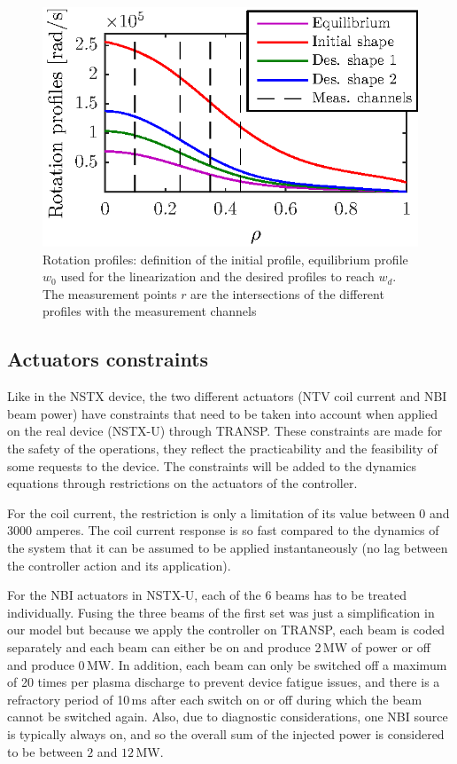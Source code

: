 \documentclass[12pt,lot, lof]{puthesis}
\begin{document}
\begin{figure}[htbp]
	\centering
	\includegraphics[width=0.7 \linewidth]{chap10/initial}
	\caption{Rotation profiles: definition of the initial profile, equilibrium profile $w_0$ used for the linearization and the desired profiles to reach $w_d$. The measurement points $r$ are the intersections of the different profiles with the measurement channels}
	\label{initnstxu}
\end{figure}

\subsection{Actuators constraints}
\label{constraintsnstxu}
Like in the NSTX device, the two different actuators (NTV coil current and NBI beam power) have constraints that need to be taken into account when applied on the real device (NSTX-U) through TRANSP. These constraints are made for the safety of the operations, they reflect the practicability and the feasibility of some requests to the device. The constraints will be added to the dynamics equations through restrictions on the actuators of the controller.

For the coil current, the restriction is only a limitation of its value between 0 and 3000 amperes.
The coil current response is so fast compared to the dynamics of the system that it can be assumed to be applied instantaneously (no lag between the controller action and its application).

For the NBI actuators in NSTX-U, each of the 6 beams has to be treated individually. Fusing the three beams of the first set was just a simplification in our model but because we apply the controller on TRANSP, each beam is coded separately and each beam can either be on and produce 2\,MW of power or off and produce 0\,MW.
In addition, each beam can only be switched off a maximum of 20 times per plasma discharge to prevent device fatigue issues, and there is a refractory period of 10\,ms after each switch on or off during which the beam cannot be switched again.
Also, due to diagnostic considerations, one NBI source is typically always on, and so the overall sum of the injected power is considered to be between $2$ and $12$\,MW.
\end{document}
